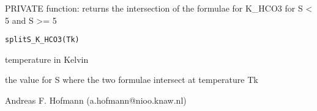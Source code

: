 \documentclass{article}
\begin{document}
\begin{Description}\relax
PRIVATE function: returns the intersection of the formulae for K\_HCO3 for S < 5 and S >= 5
\end{Description}
\begin{Usage}
\begin{verbatim}splitS_K_HCO3(Tk)\end{verbatim}
\end{Usage}
\begin{Arguments}
\begin{ldescription}
\item[\code{Tk }] temperature in Kelvin
\end{ldescription}
\end{Arguments}
\begin{Value}
the value for S where the two formulae intersect at temperature Tk
\end{Value}
\begin{Author}\relax
Andreas F. Hofmann (a.hofmann@nioo.knaw.nl)
\end{Author}
\end{document}

